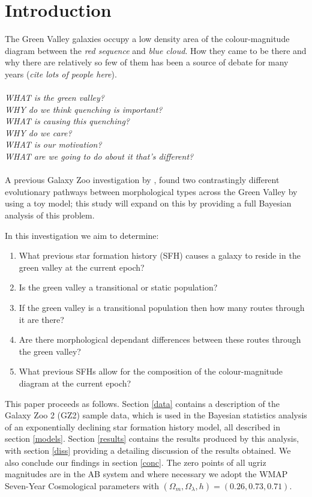 \documentclass{mn2e}
\begin{document}
\section{Introduction}
The Green Valley galaxies occupy a low density area of the colour-magnitude diagram between the \emph{red sequence} and \emph{blue cloud}. How they came to be there and why there are relatively so few of them has been a source of debate for many years (\emph{cite lots of people here}). 
\\
\\
\emph{WHAT is the green valley?\\ WHY do we think quenching is important? \\ WHAT is causing this quenching? \\ WHY do we care? \\ WHAT is our motivation? \\ WHAT are we going to do about it that's different?}
\\
\\
A previous Galaxy Zoo investigation by  \cite{Sch2014}, found two contrastingly different evolutionary pathways between morphological types across the Green Valley by using a toy model; this study will expand on this by providing a full Bayesian analysis of this problem.

In this investigation we aim to determine: 
\begin{enumerate}
\item What previous star formation history (SFH) causes a galaxy to reside in the green valley at the current epoch?
\item Is the green valley a transitional or static population? 
\item If the green valley is a transitional population then how many routes through it are there? 
\item Are there morphological dependant differences between these routes through the green valley? 
\item What previous SFHs allow for the composition of the colour-magnitude diagram at the current epoch? 
\end{enumerate}

This paper proceeds as follows. Section \ref{data} contains a description of the Galaxy Zoo 2 (GZ2) sample data, which is used in the Bayesian statistics analysis of an exponentially declining star formation history model, all described in section \ref{models}. Section \ref{results} contains the results produced by this analysis, with section \ref{diss} providing a detailing discussion of the results obtained. We also conclude our findings in section \ref{conc}. The zero points of all ugriz magnitudes are in the AB system and where necessary we adopt the WMAP Seven-Year Cosmological parameters \citep{WMAP} with $(\Omega_m, \Omega_{\lambda}, h) = (0.26, 0.73, 0.71)$. 
\end{document}
